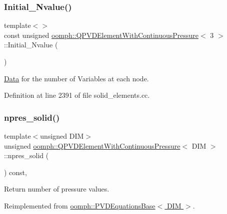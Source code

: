 \subsubsection{\texorpdfstring{Initial\+\_\+\+Nvalue()}{Initial\_Nvalue()}\hspace{0.1cm}{\footnotesize\ttfamily [2/2]}}
{\footnotesize\ttfamily template$<$$>$ \\
const unsigned \hyperlink{classoomph_1_1QPVDElementWithContinuousPressure}{oomph\+::\+Q\+P\+V\+D\+Element\+With\+Continuous\+Pressure}$<$ 3 $>$\+::Initial\+\_\+\+Nvalue (\begin{DoxyParamCaption}{ }\end{DoxyParamCaption})\hspace{0.3cm}{\ttfamily [private]}}



\hyperlink{classoomph_1_1Data}{Data} for the number of Variables at each node. 



Definition at line 2391 of file solid\+\_\+elements.\+cc.

\mbox{\label{classoomph_1_1QPVDElementWithContinuousPressure_a8d5ddf65d4462205dc889af7ba10c527}} 
\subsubsection{\texorpdfstring{npres\+\_\+solid()}{npres\_solid()}}
{\footnotesize\ttfamily template$<$unsigned D\+IM$>$ \\
unsigned \hyperlink{classoomph_1_1QPVDElementWithContinuousPressure}{oomph\+::\+Q\+P\+V\+D\+Element\+With\+Continuous\+Pressure}$<$ D\+IM $>$\+::npres\+\_\+solid (\begin{DoxyParamCaption}{ }\end{DoxyParamCaption}) const\hspace{0.3cm}{\ttfamily [inline]}, {\ttfamily [virtual]}}



Return number of pressure values. 



Reimplemented from \hyperlink{classoomph_1_1PVDEquationsBase_a6e8457327151e87d2fa5694148afc7cc}{oomph\+::\+P\+V\+D\+Equations\+Base$<$ D\+I\+M $>$}.



